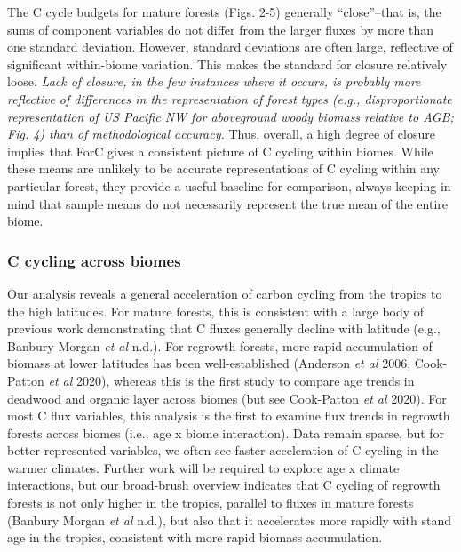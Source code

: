 \documentclass[
]{article}
\begin{document}
The C cycle budgets for mature forests (Figs. 2-5) generally
``close''--that is, the sums of component variables do not differ from
the larger fluxes by more than one standard deviation. However, standard
deviations are often large, reflective of significant within-biome
variation. This makes the standard for closure relatively loose.
\emph{Lack of closure, in the few instances where it occurs, is probably
more reflective of differences in the representation of forest types
(e.g., disproportionate representation of US Pacific NW for aboveground
woody biomass relative to AGB; Fig. 4) than of methodological accuracy.}
Thus, overall, a high degree of closure implies that ForC gives a
consistent picture of C cycling within biomes. While these means are
unlikely to be accurate representations of C cycling within any
particular forest, they provide a useful baseline for comparison, always
keeping in mind that sample means do not necessarily represent the true
mean of the entire biome.

\hypertarget{c-cycling-across-biomes}{%
\subsubsection{C cycling across biomes}\label{c-cycling-across-biomes}}

Our analysis reveals a general acceleration of carbon cycling from the
tropics to the high latitudes. For mature forests, this is consistent
with a large body of previous work demonstrating that C fluxes generally
decline with latitude (e.g., Banbury Morgan \emph{et al} n.d.). For
regrowth forests, more rapid accumulation of biomass at lower latitudes
has been well-established (Anderson \emph{et al} 2006, Cook-Patton
\emph{et al} 2020), whereas this is the first study to compare age
trends in deadwood and organic layer across biomes (but see Cook-Patton
\emph{et al} 2020). For most C flux variables, this analysis is the
first to examine flux trends in regrowth forests across biomes (i.e.,
age x biome interaction). Data remain sparse, but for better-represented
variables, we often see faster acceleration of C cycling in the warmer
climates. Further work will be required to explore age x climate
interactions, but our broad-brush overview indicates that C cycling of
regrowth forests is not only higher in the tropics, parallel to fluxes
in mature forests (Banbury Morgan \emph{et al} n.d.), but also that it
accelerates more rapidly with stand age in the tropics, consistent with
more rapid biomass accumulation.
\end{document}
